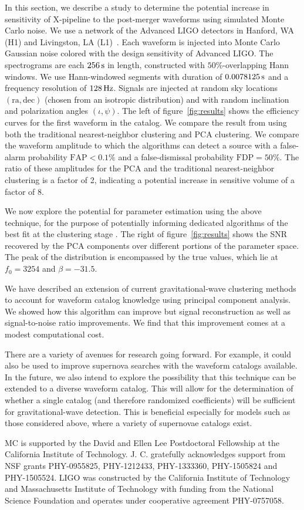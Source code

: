 \documentclass[prd,showpacs,superscriptaddress,twocolumn,
floatfix,preprintnumbers,altaffilletter]{revtex4}
\begin{document}
In this section, we describe a study to determine the potential increase in sensitivity of X-pipeline to the post-merger waveforms using simulated Monte Carlo noise.
We use a network of the Advanced LIGO detectors in Hanford, WA (H1) and Livingston, LA (L1)~\cite{aligo}.
Each waveform is injected into Monte Carlo Gaussian noise colored with the design sensitivity of Advanced LIGO.
The spectrograms are each $\unit[256]{s}$ in length, constructed with $50\%$-overlapping Hann windows. 
We use Hann-windowed segments with duration of $\unit[0.0078125]{s}$ and a frequency resolution of $\unit[128]{Hz}$.
Signals are injected at random sky locations $(\text{ra},\text{dec})$ (chosen from an isotropic distribution) and with random inclination and polarization angles $(\iota,\psi)$.
The left of figure~\ref{fig:results} shows the efficiency curves for the first waveform in the catalog. We compare the result from using both the traditional nearest-neighbor clustering and PCA clustering.
We compare the waveform amplitude to which the algorithms can detect a source with a false-alarm probability $\text{FAP}<0.1\%$ and a false-dismissal probability $\text{FDP}=50\%$.
The ratio of these amplitudes for the PCA and the traditional nearest-neighbor clustering is a factor of 2, indicating a potential increase in sensitive volume of a factor of 8.

We now explore the potential for parameter estimation using the above technique, for the purpose of potentially informing dedicated algorithms of the best fit at the clustering stage \cite{LoOt2012}. The right of figure~\ref{fig:results} shows the SNR recovered by the PCA components over different portions of the parameter space. The peak of the distribution is encompassed by the true values, which lie at $f_0 = 3254$ and $\beta = -31.5$. 

We have described an extension of current gravitational-wave clustering methods to account for waveform catalog knowledge using principal component analysis.
We showed how this algorithm can improve but signal reconstruction as well as signal-to-noise ratio improvements.
We find that this improvement comes at a modest computational cost.

There are a variety of avenues for research going forward.
For example, it could also be used to improve supernova searches with the waveform catalogs available.
In the future, we also intend to explore the possibility that this technique can be extended to a diverse waveform catalog.
This will allow for the determination of whether a single catalog (and therefore randomized coefficients) will be sufficient for gravitational-wave detection.
This is beneficial especially for models such as those considered above, where a variety of supernovae catalogs exist.

\acknowledgments
MC is supported by the David and Ellen Lee Postdoctoral Fellowship at the California Institute of Technology.
J. C. gratefully acknowledges support from NSF grants PHY-0955825, PHY-1212433, PHY-1333360, PHY-1505824 and PHY-1505524.
LIGO was constructed by the California Institute of Technology and Massachusetts Institute of Technology with funding from the National Science Foundation and operates under cooperative agreement PHY-0757058.


\end{document}
